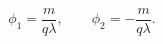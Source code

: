 \begin{equation}
\label{V} \phi_{1}= \frac{m}{q\lambda}, \qquad \phi_{2}= -\frac{m}{q\lambda}.
\end{equation}

